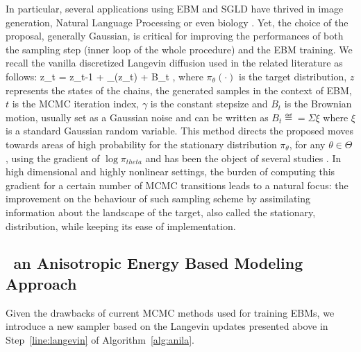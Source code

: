 \documentclass[10pt,twocolumn,letterpaper]{article}
\begin{document}
In particular, several applications using EBM and SGLD have thrived in image generation, Natural Language Processing or even biology \cite{du2020energy}.
Yet, the choice of the proposal, generally Gaussian, is critical for improving the performances of both the sampling step (inner loop of the whole procedure) and the EBM training.
We recall the vanilla discretized Langevin diffusion used in the related literature as follows:
\beq\notag
z_t = z_{t-1} +  \nabla \log \pi_\theta(z_t) + \sqrt{\gamma} B_t \eqsp,
\eeq
where $\pi_\theta(\cdot)$ is the target distribution, $z$ represents the states of the chains, \ie the generated samples in the context of EBM, $t$ is the MCMC iteration index, $\gamma$ is the constant stepsize and $B_t$ is the Brownian motion, usually set as a Gaussian noise and can be written as $B_t \eqdef = \Sigma \xi$ where $\xi$ is a standard Gaussian random variable.
This method directs the proposed moves towards areas of high probability for the stationary distribution $\pi_\theta$, for any $\theta \in \Theta$ , using the gradient of $\log \pi_{theta}$ and has been the object of several studies \cite{girolami,cotter2013mcmc}.
In high dimensional and highly nonlinear settings, the burden of computing this gradient for a certain number of MCMC transitions leads to a natural focus: the improvement on the behaviour of such sampling scheme by assimilating information about the landscape of the target, also called the stationary, distribution, while keeping its ease of implementation.

\subsection{\algo\, an Anisotropic Energy Based Modeling Approach}

Given the drawbacks of current MCMC methods used for training EBMs, we introduce a new sampler based on the Langevin updates presented above in Step~\ref{line:langevin} of Algorithm~\ref{alg:anila}.
\end{document}
